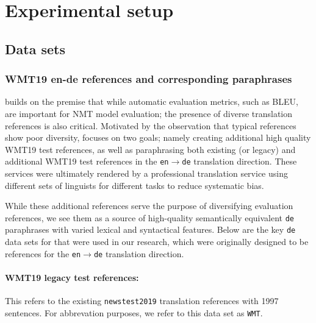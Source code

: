 \documentclass[11pt,a4paper]{article}
\begin{document}

\section{Experimental setup}

\subsection{Data sets}

\subsubsection{WMT19 en-de references and corresponding paraphrases}

\citet{freitag-bleu-paraphrase-references-2020} builds on the premise that while automatic evaluation metrics, such as BLEU, are important for NMT model evaluation; the presence of diverse translation references is also critical. Motivated by the observation that typical references show poor diversity, \citet{freitag-bleu-paraphrase-references-2020} focuses on two goals; namely creating additional high quality WMT19 test references, as well as paraphrasing both existing (or legacy) and additional WMT19 test references in the \texttt{en$\rightarrow$de} translation direction. These services were ultimately rendered by a professional translation service using different sets of linguists for different tasks to reduce systematic bias.

While these additional references serve the purpose of diversifying evaluation references, we see them as a source of high-quality semantically equivalent \texttt{de} paraphrases with varied lexical and syntactical features. Below are the key \texttt{de} data sets for that were used in our research, which were originally designed to be references for the \texttt{en$\rightarrow$de} translation direction.

\paragraph{WMT19 legacy test references:} This refers to the existing \texttt{newstest2019} translation references with 1997 sentences. For abbrevation purposes, we refer to this data set as \texttt{WMT}. 
\end{document}
